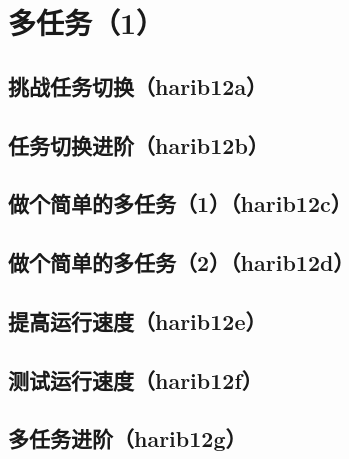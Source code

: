 ﻿\chapter{	多任务（1）	}
\section{	挑战任务切换（harib12a）	}
\section{	任务切换进阶（harib12b）	}
\section{	做个简单的多任务（1）（harib12c）	}
\section{	做个简单的多任务（2）（harib12d）	}
\section{	提高运行速度（harib12e）	}
\section{	测试运行速度（harib12f）	}
\section{	多任务进阶（harib12g）	}


